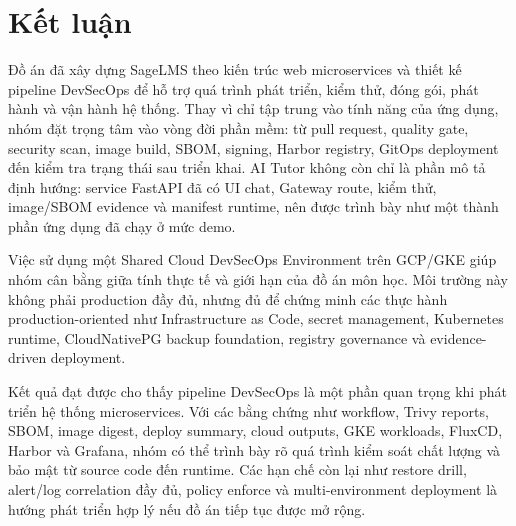 \chapter{Kết luận}
\label{chap:conclusion}

Đồ án đã xây dựng SageLMS theo kiến trúc web microservices và thiết kế pipeline DevSecOps để hỗ trợ quá trình phát triển, kiểm thử, đóng gói, phát hành và vận hành hệ thống. Thay vì chỉ tập trung vào tính năng của ứng dụng, nhóm đặt trọng tâm vào vòng đời phần mềm: từ pull request, quality gate, security scan, image build, SBOM, signing, Harbor registry, GitOps deployment đến kiểm tra trạng thái sau triển khai. AI Tutor không còn chỉ là phần mô tả định hướng: service FastAPI đã có UI chat, Gateway route, kiểm thử, image/SBOM evidence và manifest runtime, nên được trình bày như một thành phần ứng dụng đã chạy ở mức demo.

Việc sử dụng một Shared Cloud DevSecOps Environment trên GCP/GKE giúp nhóm cân bằng giữa tính thực tế và giới hạn của đồ án môn học. Môi trường này không phải production đầy đủ, nhưng đủ để chứng minh các thực hành production-oriented như Infrastructure as Code, secret management, Kubernetes runtime, CloudNativePG backup foundation, registry governance và evidence-driven deployment.

Kết quả đạt được cho thấy pipeline DevSecOps là một phần quan trọng khi phát triển hệ thống microservices. Với các bằng chứng như workflow, Trivy reports, SBOM, image digest, deploy summary, cloud outputs, GKE workloads, FluxCD, Harbor và Grafana, nhóm có thể trình bày rõ quá trình kiểm soát chất lượng và bảo mật từ source code đến runtime. Các hạn chế còn lại như restore drill, alert/log correlation đầy đủ, policy enforce và multi-environment deployment là hướng phát triển hợp lý nếu đồ án tiếp tục được mở rộng.
